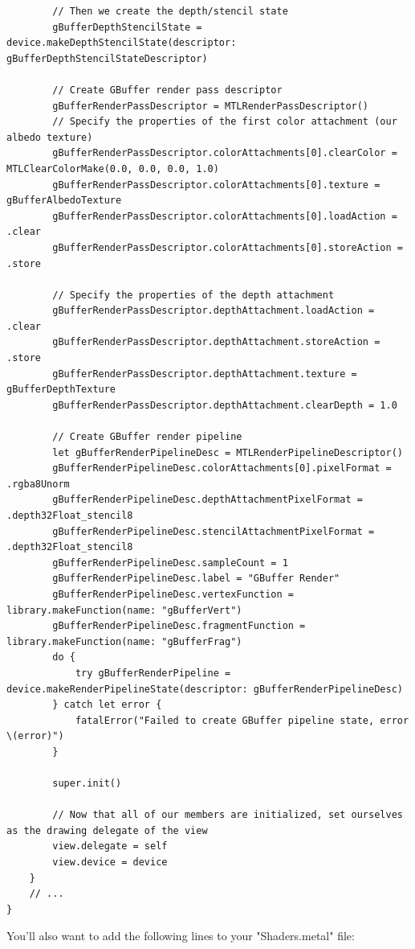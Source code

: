 \documentclass[11pt]{article}
\begin{document}
\begin{verbatim}
        // Then we create the depth/stencil state
        gBufferDepthStencilState = device.makeDepthStencilState(descriptor: gBufferDepthStencilStateDescriptor)

        // Create GBuffer render pass descriptor
        gBufferRenderPassDescriptor = MTLRenderPassDescriptor()
        // Specify the properties of the first color attachment (our albedo texture)
        gBufferRenderPassDescriptor.colorAttachments[0].clearColor = MTLClearColorMake(0.0, 0.0, 0.0, 1.0)
        gBufferRenderPassDescriptor.colorAttachments[0].texture = gBufferAlbedoTexture
        gBufferRenderPassDescriptor.colorAttachments[0].loadAction = .clear
        gBufferRenderPassDescriptor.colorAttachments[0].storeAction = .store

        // Specify the properties of the depth attachment
        gBufferRenderPassDescriptor.depthAttachment.loadAction = .clear
        gBufferRenderPassDescriptor.depthAttachment.storeAction = .store
        gBufferRenderPassDescriptor.depthAttachment.texture = gBufferDepthTexture
        gBufferRenderPassDescriptor.depthAttachment.clearDepth = 1.0

        // Create GBuffer render pipeline
        let gBufferRenderPipelineDesc = MTLRenderPipelineDescriptor()
        gBufferRenderPipelineDesc.colorAttachments[0].pixelFormat = .rgba8Unorm
        gBufferRenderPipelineDesc.depthAttachmentPixelFormat = .depth32Float_stencil8
        gBufferRenderPipelineDesc.stencilAttachmentPixelFormat = .depth32Float_stencil8
        gBufferRenderPipelineDesc.sampleCount = 1
        gBufferRenderPipelineDesc.label = "GBuffer Render"
        gBufferRenderPipelineDesc.vertexFunction = library.makeFunction(name: "gBufferVert")
        gBufferRenderPipelineDesc.fragmentFunction = library.makeFunction(name: "gBufferFrag")
        do {
            try gBufferRenderPipeline = device.makeRenderPipelineState(descriptor: gBufferRenderPipelineDesc)
        } catch let error {
            fatalError("Failed to create GBuffer pipeline state, error \(error)")
        }

        super.init()

        // Now that all of our members are initialized, set ourselves as the drawing delegate of the view
        view.delegate = self
        view.device = device
    }
    // ...
}
\end{verbatim}


You'll also want to add the following lines to your "Shaders.metal" file:
\end{document}
